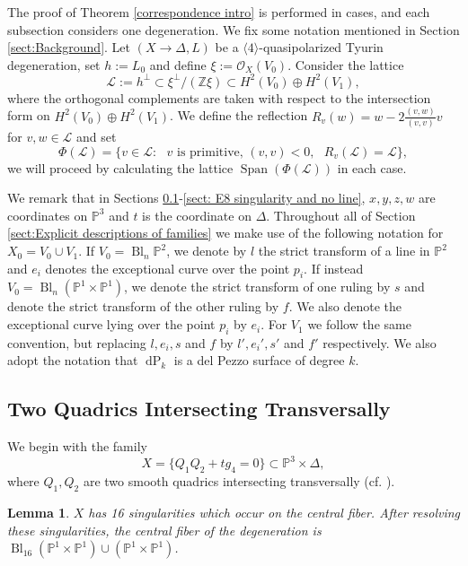\documentclass[a4paper]{amsart}
\theoremstyle{definition}
\theoremstyle{plain}
\newtheorem{lemma}[defn]{Lemma}
\theoremstyle{remark}
\newcommand{\PS}{\mathbb{P}}
\newcommand{\Z}{\mathbb{Z}}
\begin{document}
The proof of Theorem \ref{correspondence intro} is performed in cases, and each subsection considers one degeneration. We fix some notation mentioned in Section \ref{sect:Background}. Let $(X\rightarrow \Delta,L)$ be a $\langle 4\rangle$-quasipolarized Tyurin degeneration, set $h:=L_0$ and define $\xi:=\mathcal{O}_X(V_0)$. Consider the lattice 
$$\mathscr{L}:= h ^\perp \subset\xi^\perp/(\Z\xi) \subset  H^2(V_0)\oplus H^2(V_1),$$
where the orthogonal complements are taken with respect to the intersection form on $H^2(V_0)\oplus H^2(V_1)$. We define the reflection $R_v(w)=w-2\frac{(v,w)}{(v,v)}v$ for $v,w\in\mathscr{L}$ and set
$$\Phi(\mathscr{L}) = \{v \in \mathscr{L} : \text{ } v \text{ is primitive, } (v,v) < 0, \text{ 
}R_v(\mathscr{L})=  \mathscr{L}\},$$
we will proceed by calculating the lattice $\operatorname{Span}(\Phi(\mathscr{L}))$ in each case.

We remark that in Sections \ref{sect:Two Quadrics}-\ref{sect: E8 singularity and no line}, $x,y,z,w$ are coordinates on $\PS^3$ and $t$ is the coordinate on $\Delta$. Throughout all of Section \ref{sect:Explicit descriptions of families} we make use of the following notation for $X_0=V_0\cup V_1$. If $V_0 = \operatorname{Bl}_n\PS^2$, we denote by $l$ the strict transform of a line in $\PS^2$ and $e_i$ denotes the exceptional curve over the point $p_i$. If instead $V_0=\operatorname{Bl}_n(\PS^1\times\PS^1)$, we denote the strict transform of one ruling by $s$ and denote the strict transform of the other ruling by $f$. We also denote the exceptional curve lying over the point $p_i$ by $e_i$. For $V_1$ we follow the same convention, but replacing $l,e_i,s$ and $f$ by $l',e_i',s'$ and $f'$ respectively. We also adopt the notation that $\operatorname{dP}_k$ is a del Pezzo surface of degree $k$.

\subsection{Two Quadrics Intersecting Transversally}\label{sect:Two Quadrics}
We begin with the family 
$$X = \{Q_1Q_2+tg_4=0\} \subset \mathbb{P}^3 \times \Delta,$$
where $Q_1, Q_2$ are two smooth quadrics intersecting transversally (cf. \cite[Case S-3]{Shah81}).

\begin{lemma}\label{Description two quadrics}
$X$ has 16 singularities which occur on the central fiber. After resolving these singularities, the central fiber of the degeneration is $\operatorname{Bl}_{16}(\PS^1\times\PS^1)\cup(\PS^1\times\PS^1)$.
\end{lemma}
\end{document}
